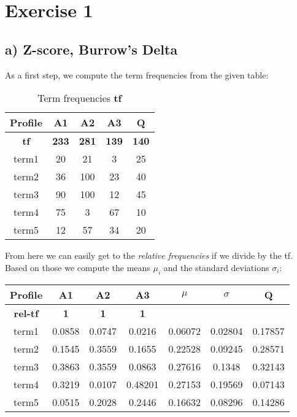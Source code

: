 \documentclass[a4paper]{article}
\begin{document}
\section*{Exercise 1}
\subsection*{a) Z-score, Burrow's Delta}
As a first step, we compute the term frequencies from the given table:
\begin{table}[h]
\centering
\begin{tabular}{| c | c | c | c | c |}
\hline
\textbf{Profile} & \textbf{A1} & \textbf{A2} & \textbf{A3} & \textbf{Q} \\ \hline
\textbf{tf} & \textbf{233} & \textbf{281} & \textbf{139} & \textbf{140} \\ \hline
term1 & 20 & 21 & 3 & 25\\ \hline
term2 & 36 & 100 & 23 & 40\\ \hline
term3 & 90 & 100 & 12 & 45 \\ \hline
term4 & 75 & 3 & 67 & 10 \\ \hline
term5 & 12 & 57 & 34 & 20 \\ \hline
\end{tabular}
\caption{Term frequencies \textbf{tf}}
\end{table}

\noindent From here we can easily get to the \emph{relative frequencies} if we divide by the tf. Based on those we compute the means $\mu_i$ and the standard deviations $\sigma_i$:
\begin{table}[h]
\centering
\begin{tabular}{| c | c | c | c | c | c | c |}
\hline
\textbf{Profile} & \textbf{A1} & \textbf{A2} & \textbf{A3} & $\mu$ & $\sigma$ & \textbf{Q} \\ \hline
\textbf{rel-tf} & \textbf{1} & \textbf{1} & \textbf{1} &  & &  \\ \hline
term1 & 0.0858 & 0.0747 & 0.0216  & 0.06072 & 0.02804 & 0.17857 \\ \hline
term2 & 0.1545 & 0.3559 & 0.1655  & 0.22528 & 0.09245 & 0.28571 \\ \hline
term3 & 0.3863 & 0.3559 & 0.0863  & 0.27616 & 0.1348 &  0.32143 \\ \hline
term4 & 0.3219 & 0.0107 & 0.48201 & 0.27153 & 0.19569 & 0.07143 \\ \hline
term5 & 0.0515 & 0.2028 & 0.2446  & 0.16632 & 0.08296 & 0.14286 \\ \hline
\end{tabular}
\end{table}
\end{document}
